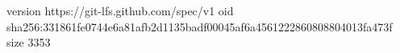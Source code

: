 version https://git-lfs.github.com/spec/v1
oid sha256:331861fe0744e6a81afb2d1135badf00045af6a4561222860808804013fa473f
size 3353

